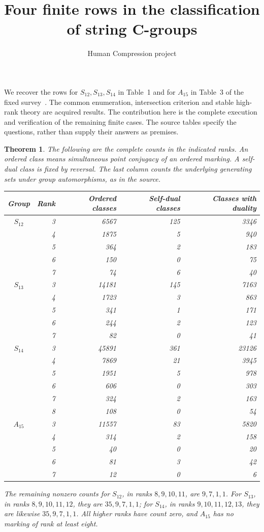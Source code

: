 \documentclass[10pt,a4paper]{article}
\title{Four finite rows in the classification of string C-groups}
\author{Human Compression project}\date{}
\newtheorem{theorem}{Theorem}
\begin{document}
\maketitle
We recover the rows for $S_{12},S_{13},S_{14}$ in Table~1 and for $A_{15}$
in Table~3 of the fixed survey~\cite{survey}. The common enumeration,
intersection criterion and stable high-rank theory are acquired results.
The contribution here is the complete execution and verification of the
remaining finite cases. The source tables specify the questions, rather
than supply their answers as premises.

\begin{theorem}\label{counts}
The following are the complete counts in the indicated ranks. An ordered
class means simultaneous point conjugacy of an ordered marking. A
self-dual class is fixed by reversal. The last column counts the
underlying generating sets under group automorphisms, as in the source.
\begin{center}\small
\begin{tabular}{crrrr}\toprule
Group&Rank&Ordered classes&Self-dual classes&Classes with duality\\\midrule
$S_{12}$&3&6567&125&3346\\
&4&1875&5&940\\
&5&364&2&183\\
&6&150&0&75\\
&7&74&6&40\\\midrule
$S_{13}$&3&14181&145&7163\\
&4&1723&3&863\\
&5&341&1&171\\
&6&244&2&123\\
&7&82&0&41\\\midrule
$S_{14}$&3&45891&361&23126\\
&4&7869&21&3945\\
&5&1951&5&978\\
&6&606&0&303\\
&7&324&2&163\\
&8&108&0&54\\\midrule
$A_{15}$&3&11557&83&5820\\
&4&314&2&158\\
&5&40&0&20\\
&6&81&3&42\\
&7&12&0&6\\\bottomrule
\end{tabular}\end{center}
The remaining nonzero counts for $S_{12}$, in ranks $8,9,10,11$, are
$9,7,1,1$. For $S_{13}$, in ranks $8,9,10,11,12$, they are
$35,9,7,1,1$; for $S_{14}$, in ranks $9,10,11,12,13$, they are likewise
$35,9,7,1,1$. All higher ranks have count zero, and $A_{15}$ has no
marking of rank at least eight.
\end{theorem}
\end{document}
